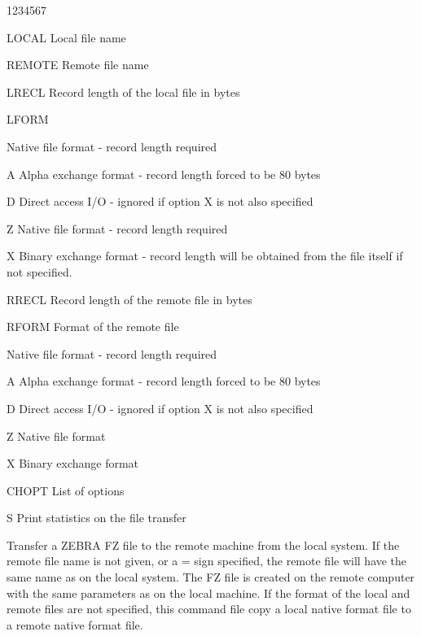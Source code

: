 \begin{DLtt}{1234567}
\item[LOCAL]Local file name
\item[REMOTE]Remote file name
\item[LRECL]Record length of the local file in bytes
\item[LFORM]
\begin{DLtt}{12}
\item[ ]Native file format - record length required
\item[A]Alpha exchange format - record length forced to be 80 bytes
\item[D]Direct access I/O - ignored if option X is not also specified
\item[Z]Native file format - record length required
\item[X]Binary exchange format - record length will be obtained from
the file itself if not specified.
\end{DLtt}
\item[RRECL]Record length of the remote file in bytes
\item[RFORM]Format of the remote file
\begin{DLtt}{12}
\item[ ]Native file format - record length required
\item[A]Alpha exchange format - record length forced to be 80 bytes
\item[D]Direct access I/O - ignored if option X is not also specified
\item[Z]Native file format
\item[X]Binary exchange format
\end{DLtt}
\item[CHOPT]List of options
\begin{DLtt}{12}
\item[S]Print statistics on the file transfer
\end{DLtt}
\end{DLtt}
Transfer a ZEBRA FZ
file to the remote machine from the local system.
If the remote file name is not given, or a = sign specified,
the remote file will have the same name as on the local system.
The FZ file is created on the remote computer with the same
parameters as on the local machine.
If the format of the local and remote files are not specified,
this command file copy a local native format file to a remote
native format file.

